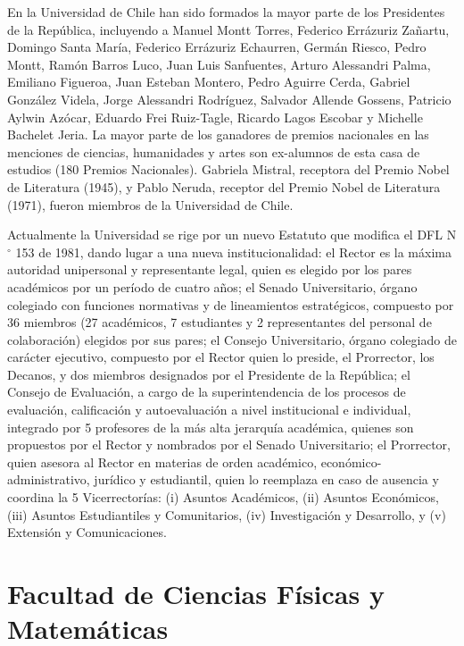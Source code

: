 En la Universidad de Chile han sido formados la mayor parte de los Presidentes de la
República, incluyendo a Manuel Montt Torres, Federico Errázuriz Zañartu, Domingo Santa María,
Federico Errázuriz Echaurren, Germán Riesco, Pedro Montt, Ramón Barros Luco, Juan Luis
Sanfuentes, Arturo Alessandri Palma, Emiliano Figueroa, Juan Esteban Montero, Pedro Aguirre
Cerda, Gabriel González Videla, Jorge Alessandri Rodríguez, Salvador Allende Gossens, Patricio
Aylwin Azócar, Eduardo Frei Ruiz-Tagle, Ricardo Lagos Escobar y Michelle Bachelet Jeria. La
mayor parte de los ganadores de premios nacionales en las menciones de ciencias, humanidades y
artes son ex-alumnos de esta casa de estudios (180 Premios Nacionales).
Gabriela Mistral, receptora del Premio Nobel de Literatura (1945), y Pablo Neruda, 
receptor del Premio Nobel de Literatura (1971), fueron miembros de la Universidad de Chile.

Actualmente la Universidad se rige por un nuevo Estatuto que modifica el DFL N$^{\circ}$ 153 de
1981, dando lugar a una nueva institucionalidad: el Rector es la máxima autoridad unipersonal
y representante legal, quien es elegido por los pares académicos por un período de cuatro
años; el Senado Universitario, órgano colegiado con funciones normativas y de lineamientos
estratégicos, compuesto por 36 miembros (27 académicos, 7 estudiantes y 2 representantes del
personal de colaboración) elegidos por sus pares; el Consejo Universitario, órgano colegiado
de carácter ejecutivo, compuesto por el Rector quien lo preside, el Prorrector, los Decanos,
y dos miembros designados por el Presidente de la República; el Consejo de Evaluación, a
cargo de la superintendencia de los procesos de evaluación, calificación y autoevaluación a nivel
institucional e individual, integrado por 5 profesores de la más alta jerarquía académica, quienes
son propuestos por el Rector y nombrados por el Senado Universitario; el Prorrector, quien asesora
al Rector en materias de orden académico, económico-administrativo, jurídico y estudiantil, quien
lo reemplaza en caso de ausencia y coordina la 5 Vicerrectorías: (i) Asuntos Académicos, (ii)
Asuntos Económicos, (iii) Asuntos Estudiantiles y Comunitarios, (iv) Investigación y Desarrollo,
y (v) Extensión y Comunicaciones.

\section{Facultad de Ciencias Físicas y Matemáticas}

